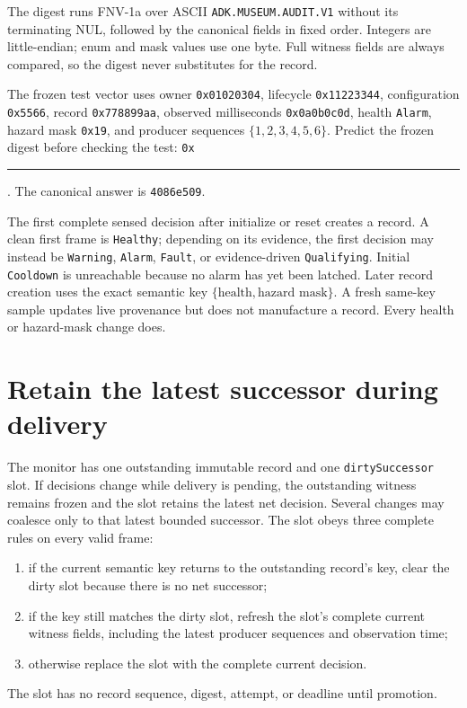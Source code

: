 \documentclass[10pt]{article}
\newcommand{\longblank}{\rule{1.35in}{0.4pt}}
\begin{document}
The digest runs FNV-1a over ASCII \texttt{ADK.MUSEUM.AUDIT.V1} without its
terminating NUL, followed by the canonical fields in fixed order. Integers are
little-endian; enum and mask values use one byte. Full witness fields are
always compared, so the digest never substitutes for the record.

The frozen test vector uses owner \texttt{0x01020304}, lifecycle
\texttt{0x11223344}, configuration \texttt{0x5566}, record
\texttt{0x778899aa}, observed milliseconds \texttt{0x0a0b0c0d}, health
\texttt{Alarm}, hazard mask \texttt{0x19}, and producer sequences
\(\{1,2,3,4,5,6\}\). Predict the frozen digest before checking the test:
\texttt{0x}\longblank. The canonical answer is \texttt{4086e509}.

The first complete sensed decision after initialize or reset creates a
record. A clean first frame is \texttt{Healthy}; depending on its evidence,
the first decision may instead be \texttt{Warning}, \texttt{Alarm},
\texttt{Fault}, or evidence-driven \texttt{Qualifying}. Initial
\texttt{Cooldown} is unreachable because no alarm has yet been latched.
Later record creation uses the exact semantic key
\(\{\text{health},\text{hazard mask}\}\). A fresh same-key sample updates live
provenance but does not manufacture a record. Every health or hazard-mask
change does.

\section{Retain the latest successor during delivery}
The monitor has one outstanding immutable record and one
\texttt{dirtySuccessor} slot. If decisions change while delivery is pending,
the outstanding witness remains frozen and the slot retains the latest net
decision. Several changes may coalesce only to that latest bounded successor.
The slot obeys three complete rules on every valid frame:
\begin{enumerate}
 \item if the current semantic key returns to the outstanding record's key,
       clear the dirty slot because there is no net successor;
 \item if the key still matches the dirty slot, refresh the slot's complete
       current witness fields, including the latest producer sequences and
       observation time;
 \item otherwise replace the slot with the complete current decision.
\end{enumerate}
The slot has no record sequence, digest, attempt, or deadline until promotion.
\end{document}
